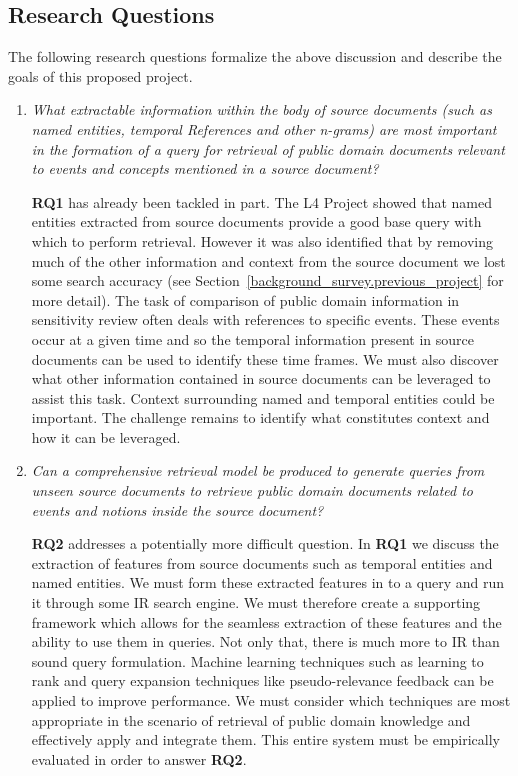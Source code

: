 \documentclass{mprop}
\begin{document}
\subsection{Research Questions}
The following research questions formalize the above discussion and describe the goals of this proposed project.
\begin{enumerate}[label=\textbf{RQ.\arabic*}]
\item \textit{What extractable information within the body of source documents (such as named entities, temporal References and other n-grams) are most important in the formation of a query for retrieval of public domain documents relevant to events and concepts mentioned in a source document? }

\textbf{RQ1} has already been tackled in part. 
The L4 Project showed that named entities extracted from source documents provide a good base query with which to perform retrieval. 
However it was also identified that by removing much of the other information and context from the source document we lost some search accuracy (see Section~\ref{background_survey.previous_project} for more detail). 
The task of comparison of public domain information in sensitivity review often deals with references to specific events. 
These events occur at a given time and so the temporal information present in source documents can be used to identify these time frames. 
We must also discover what other information contained in source documents can be leveraged to assist this task.
Context surrounding named and temporal entities could be important. 
The challenge remains to identify what constitutes context and how it can be leveraged.

\item \textit{Can a comprehensive retrieval model be produced to generate queries from unseen source documents to retrieve public domain documents related to events and notions inside the source document?}

\textbf{RQ2} addresses a potentially more difficult question. 
In \textbf{RQ1} we discuss the extraction of features from source documents such as temporal entities and named entities. 
We must form these extracted features in to a query and run it through some IR search engine. 
We must therefore create a supporting framework which allows for the seamless extraction of these features and the ability to use them in queries. 
Not only that, there is much more to IR than sound query formulation. 
Machine learning techniques such as learning to rank and query expansion techniques like pseudo-relevance feedback can be applied to improve performance. 
We must consider which techniques are most appropriate in the scenario of retrieval of public domain knowledge and effectively apply and integrate them. 
This entire system must be empirically evaluated in order to answer \textbf{RQ2}.
\end{enumerate}
\end{document}
